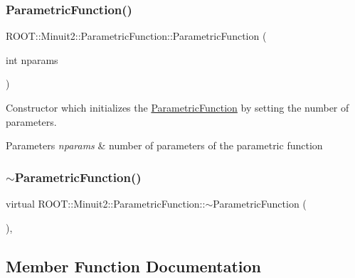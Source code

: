 \subsubsection{\texorpdfstring{ParametricFunction()}{ParametricFunction()}\hspace{0.1cm}{\footnotesize\ttfamily [4/4]}}
{\footnotesize\ttfamily R\+O\+O\+T\+::\+Minuit2\+::\+Parametric\+Function\+::\+Parametric\+Function (\begin{DoxyParamCaption}\item[{int}]{nparams }\end{DoxyParamCaption})\hspace{0.3cm}{\ttfamily [inline]}}

Constructor which initializes the \mbox{\hyperlink{classROOT_1_1Minuit2_1_1ParametricFunction}{Parametric\+Function}} by setting the number of parameters.


\begin{DoxyParams}{Parameters}
{\em nparams} & number of parameters of the parametric function \\
\hline
\end{DoxyParams}
\mbox{\label{classROOT_1_1Minuit2_1_1ParametricFunction_a18aae731e634b4fc1c79403d8f49caa9}} 
\subsubsection{\texorpdfstring{$\sim$ParametricFunction()}{~ParametricFunction()}\hspace{0.1cm}{\footnotesize\ttfamily [2/2]}}
{\footnotesize\ttfamily virtual R\+O\+O\+T\+::\+Minuit2\+::\+Parametric\+Function\+::$\sim$\+Parametric\+Function (\begin{DoxyParamCaption}{ }\end{DoxyParamCaption})\hspace{0.3cm}{\ttfamily [inline]}, {\ttfamily [virtual]}}



\subsection{Member Function Documentation}
\mbox{\label{classROOT_1_1Minuit2_1_1ParametricFunction_abe6cfa5c64c578101da1d6fcecfb2249}} 

